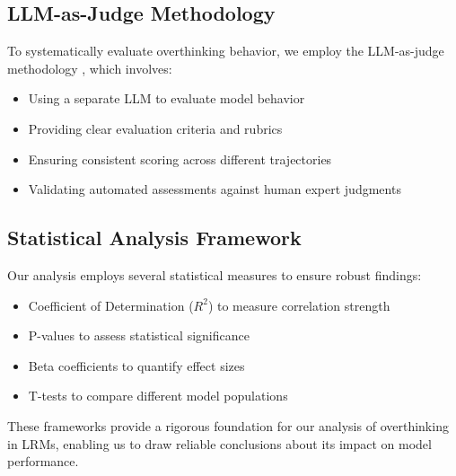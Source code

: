 \subsection{LLM-as-Judge Methodology}
To systematically evaluate overthinking behavior, we employ the LLM-as-judge methodology \cite{zheng2023judgingllmasajudgemtbenchchatbot}, which involves:
\begin{itemize}
    \item Using a separate LLM to evaluate model behavior
    \item Providing clear evaluation criteria and rubrics
    \item Ensuring consistent scoring across different trajectories
    \item Validating automated assessments against human expert judgments
\end{itemize}

\subsection{Statistical Analysis Framework}
Our analysis employs several statistical measures to ensure robust findings:
\begin{itemize}
    \item Coefficient of Determination ($R^2$) to measure correlation strength
    \item P-values to assess statistical significance
    \item Beta coefficients to quantify effect sizes
    \item T-tests to compare different model populations
\end{itemize}

These frameworks provide a rigorous foundation for our analysis of overthinking in LRMs, enabling us to draw reliable conclusions about its impact on model performance.







